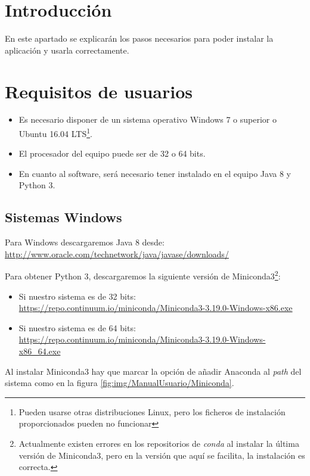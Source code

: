 
\section{Introducción}
En este apartado se explicarán los pasos necesarios para poder instalar la aplicación y usarla correctamente.

\section{Requisitos de usuarios}
\begin{itemize}
    \item Es necesario disponer de un sistema operativo Windows 7 o superior o Ubuntu 16.04 LTS\footnote{Pueden usarse otras distribuciones Linux, pero los ficheros de instalación proporcionados pueden no funcionar}.

    \item El procesador del equipo puede ser de 32 o 64 bits.

    \item En cuanto al software, será necesario tener instalado en el equipo Java 8 y Python 3.
\end{itemize}


\subsection{Sistemas Windows}
Para Windows descargaremos Java 8 desde:\\ \url{http://www.oracle.com/technetwork/java/javase/downloads/}

Para obtener Python 3, descargaremos la siguiente versión de Miniconda3\footnote{Actualmente existen errores en los repositorios de \textit{conda} al instalar la última versión de Miniconda3, pero en la versión que aquí se facilita, la instalación es correcta.}:
\begin{itemize}
    \item Si nuestro sistema es de 32 bits:\\ \url{https://repo.continuum.io/miniconda/Miniconda3-3.19.0-Windows-x86.exe}
    \item Si nuestro sistema es de 64 bits:\\ \url{https://repo.continuum.io/miniconda/Miniconda3-3.19.0-Windows-x86_64.exe}
\end{itemize}
Al instalar Miniconda3 hay que marcar la opción de añadir Anaconda al \textit{path} del sistema como en la figura \ref{fig:img/ManualUsuario/Miniconda}.

